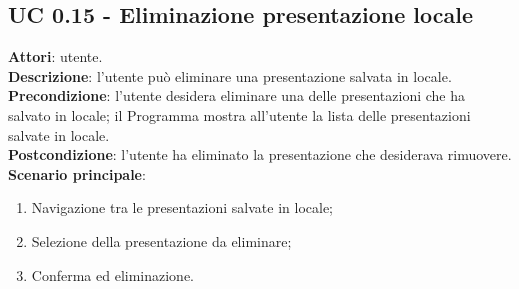 \subsection{UC 0.15 - Eliminazione presentazione locale}{
	\label{uc0.15}
	\textbf{Attori}: utente.\\
	\textbf{Descrizione}: l'utente può eliminare una presentazione salvata in locale.\\
	\textbf{Precondizione}: l'utente desidera eliminare una delle presentazioni che ha salvato in locale; il Programma mostra all'utente la lista delle presentazioni salvate in locale.\\
	\textbf{Postcondizione}: l'utente ha eliminato la presentazione che desiderava rimuovere.\\
	\textbf{Scenario principale}:
	\begin{enumerate}
		\item Navigazione tra le presentazioni salvate in locale;
		\item Selezione della presentazione da eliminare;
		\item Conferma ed eliminazione.
	\end{enumerate}
}